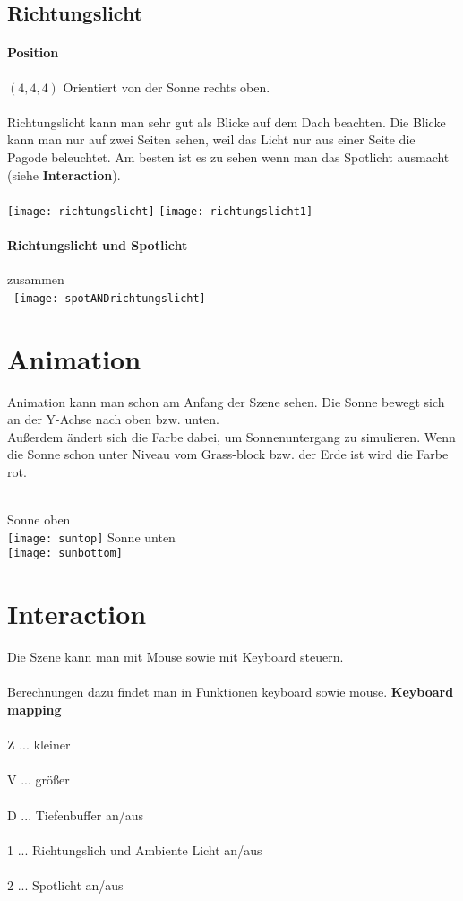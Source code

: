 \documentclass[12pt]{article}
\begin{document}
\subsection{Richtungslicht}
\paragraph{Position} $(4,4,4)$ Orientiert von der Sonne rechts oben.\\\\ 
Richtungslicht kann man sehr gut als Blicke auf dem Dach beachten. Die Blicke kann man nur auf zwei Seiten sehen, weil das Licht nur aus einer Seite die Pagode beleuchtet. Am besten ist es zu sehen wenn man das Spotlicht ausmacht (siehe \textbf{Interaction}).\\\\ 
\texttt{[image: richtungslicht]}
\texttt{[image: richtungslicht1]}
\paragraph{Richtungslicht und Spotlicht} zusammen \\\
\texttt{[image: spotANDrichtungslicht]}


\pagebreak

\section{Animation}
Animation kann man schon am Anfang der Szene sehen. Die Sonne bewegt sich an der Y-Achse nach oben bzw. unten. \\
Außerdem ändert sich die Farbe dabei, um Sonnenuntergang zu simulieren.
Wenn die Sonne schon unter Niveau vom Grass-block bzw. der Erde ist wird die Farbe rot. \\\\
\begin{center}
Sonne oben\\
\texttt{[image: suntop]} 
\bigbreak
Sonne unten\\
\texttt{[image: sunbottom]}
\end{center}

\pagebreak

\section{Interaction}
Die Szene kann man mit Mouse sowie mit Keyboard steuern.\\\\
Berechnungen dazu findet man in Funktionen keyboard sowie mouse.\bigbreak
\textbf{Keyboard mapping} \\\\
Z ... kleiner \\\\
V ... größer \\\\
D ... Tiefenbuffer an/aus \\\\
1 ... Richtungslich und Ambiente Licht an/aus \\\\
2 ... Spotlicht an/aus
\end{document}
